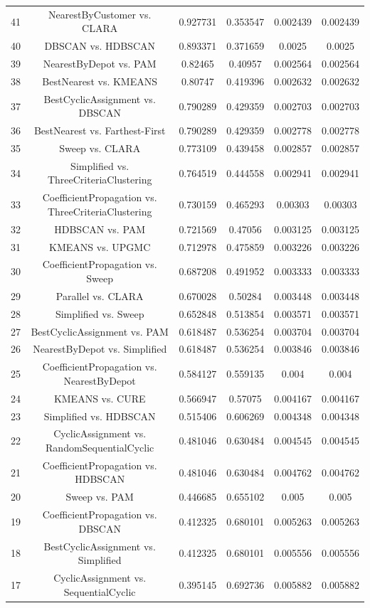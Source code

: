 \documentclass[a4paper,10pt]{article}
\begin{document}
\begin{landscape}
\begin{table}[!htp]
\begin{tabular}{cccccc}
41&NearestByCustomer vs. CLARA&0.927731&0.353547&0.002439&0.002439\\
40&DBSCAN vs. HDBSCAN&0.893371&0.371659&0.0025&0.0025\\
39&NearestByDepot vs. PAM&0.82465&0.40957&0.002564&0.002564\\
38&BestNearest vs. KMEANS&0.80747&0.419396&0.002632&0.002632\\
37&BestCyclicAssignment vs. DBSCAN&0.790289&0.429359&0.002703&0.002703\\
36&BestNearest vs. Farthest-First&0.790289&0.429359&0.002778&0.002778\\
35&Sweep vs. CLARA&0.773109&0.439458&0.002857&0.002857\\
34&Simplified vs. ThreeCriteriaClustering&0.764519&0.444558&0.002941&0.002941\\
33&CoefficientPropagation vs. ThreeCriteriaClustering&0.730159&0.465293&0.00303&0.00303\\
32&HDBSCAN vs. PAM&0.721569&0.47056&0.003125&0.003125\\
31&KMEANS vs. UPGMC&0.712978&0.475859&0.003226&0.003226\\
30&CoefficientPropagation vs. Sweep&0.687208&0.491952&0.003333&0.003333\\
29&Parallel vs. CLARA&0.670028&0.50284&0.003448&0.003448\\
28&Simplified vs. Sweep&0.652848&0.513854&0.003571&0.003571\\
27&BestCyclicAssignment vs. PAM&0.618487&0.536254&0.003704&0.003704\\
26&NearestByDepot vs. Simplified&0.618487&0.536254&0.003846&0.003846\\
25&CoefficientPropagation vs. NearestByDepot&0.584127&0.559135&0.004&0.004\\
24&KMEANS vs. CURE&0.566947&0.57075&0.004167&0.004167\\
23&Simplified vs. HDBSCAN&0.515406&0.606269&0.004348&0.004348\\
22&CyclicAssignment vs. RandomSequentialCyclic&0.481046&0.630484&0.004545&0.004545\\
21&CoefficientPropagation vs. HDBSCAN&0.481046&0.630484&0.004762&0.004762\\
20&Sweep vs. PAM&0.446685&0.655102&0.005&0.005\\
19&CoefficientPropagation vs. DBSCAN&0.412325&0.680101&0.005263&0.005263\\
18&BestCyclicAssignment vs. Simplified&0.412325&0.680101&0.005556&0.005556\\
17&CyclicAssignment vs. SequentialCyclic&0.395145&0.692736&0.005882&0.005882\\

\end{tabular}
\end{table}
\end{landscape}
\end{document}
